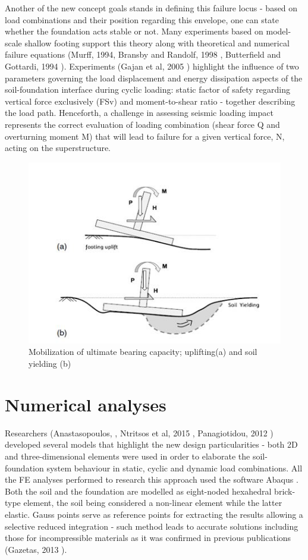 \documentclass[12pt,a4paper]{report}
\begin{document}
Another of the new concept goals stands in defining this failure locus - based on load combinations and their position regarding this envelope, one can state whether the foundation acts stable or not. Many experiments based on model-scale shallow footing support this theory along with theoretical and numerical failure equations (Murff, 1994, Bransby and Randolf, 1998 \cite{bransby1998combined}, Butterfield and Gottardi, 1994 \cite{gottardi1999plastic}). Experiments (Gajan et al, 2005 \cite{gajan2005centrifuge}) highlight the influence of two parameters governing the load displacement and energy dissipation aspects of the soil-foundation interface during cyclic loading: static factor of safety regarding vertical force exclusively (FSv) and moment-to-shear ratio - together describing the load path. Henceforth, a challenge in assessing seismic loading impact represents the correct evaluation of loading combination (shear force Q and overturning moment M) that will lead to failure for a given vertical force, N, acting on the superstructure.

\begin{figure}[h!]
	\centering
	\includegraphics[width=0.8\linewidth]{"uplift"}
	\caption{Mobilization of ultimate bearing capacity; uplifting(a) and soil yielding (b)}
	\label{uplift}
\end{figure}

\section{Numerical analyses}
Researchers (Anastasopoulos, \cite{anastasopoulos2014simplified}, Ntritsos et al, 2015 \cite{ntritsos2015static}, Panagiotidou, 2012 \cite{panagiotidou2012pushover}) developed several models that highlight the new design particularities - both 2D and three-dimensional elements were used in order to elaborate the soil-foundation system behaviour in static, cyclic and dynamic load combinations. All the FE analyses performed to research this approach used the software Abaqus \cite{manualversion}. Both the soil and the foundation are modelled as eight-noded hexahedral brick-type element, the soil being considered a non-linear element while the latter elastic. Gauss points serve as reference points for extracting the results allowing a selective reduced integration - such method leads to accurate solutions including those for incompressible materials as it was confirmed in previous publications (Gazetas, 2013 \cite{gazetas2013nonlinear}).
\end{document}
